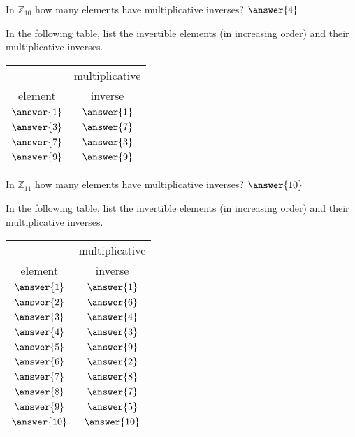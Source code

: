 \documentclass[space,nooutcomes,handout]{ximera}
\begin{document}
\begin{problem}
In $\mathbb{Z}_{10}$ how many elements have multiplicative inverses?   $\answer{4}$
\begin{problem} 
In the following table, list the invertible elements (in increasing order) and their multiplicative inverses. 
\begin{image}
\begin{tabular}{c | c}
\hline
              & multiplicative \\
element & inverse \\
\hline
$\answer{1}$ & $\answer{1}$ \\
$\answer{3}$ & $\answer{7}$ \\
$\answer{7}$ & $\answer{3}$ \\
$\answer{9}$ & $\answer{9}$ \\
\hline
\end{tabular}
\end{image}
\end{problem}
\end{problem}


\begin{problem}
In $\mathbb{Z}_{11}$ how many elements have multiplicative inverses?   $\answer{10}$
\begin{problem} 
In the following table, list the invertible elements (in increasing order) and their multiplicative inverses. 
\begin{image}
\begin{tabular}{c | c}
\hline
              & multiplicative \\
element & inverse \\
\hline
$\answer{1}$ & $\answer{1}$ \\
$\answer{2}$ & $\answer{6}$ \\
$\answer{3}$ & $\answer{4}$ \\
$\answer{4}$ & $\answer{3}$ \\
$\answer{5}$ & $\answer{9}$ \\
$\answer{6}$ & $\answer{2}$ \\
$\answer{7}$ & $\answer{8}$ \\
$\answer{8}$ & $\answer{7}$ \\
$\answer{9}$ & $\answer{5}$ \\
$\answer{10}$ & $\answer{10}$ \\
\hline
\end{tabular}
\end{image}
\end{problem}
\end{problem}
\end{document}
